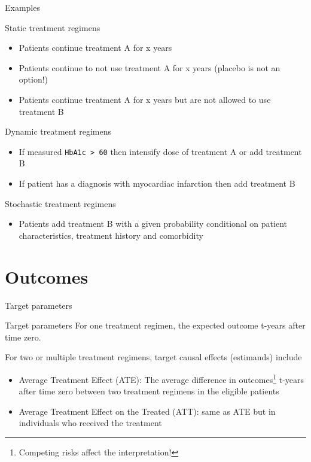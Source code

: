 \documentclass{beamer}\usepackage{listings}
\begin{document}
\begin{frame}[label={sec:orgbc0815b},fragile]{Examples}
 \begin{block}{Static treatment regimens}
\begin{itemize}
\item Patients continue treatment A for x years
\item Patients continue to not use treatment A for x years (placebo is not an option!)
\item Patients continue treatment A for x years but are not allowed to use treatment B
\end{itemize}
\end{block}

\begin{block}{Dynamic treatment regimens}
\begin{itemize}
\item If measured \texttt{HbA1c > 60} then intensify dose of treatment A or add treatment B
\item If patient has a diagnosis with myocardiac infarction then add treatment B
\end{itemize}
\end{block}

\begin{block}{Stochastic treatment regimens}
\begin{itemize}
\item Patients add treatment B with a given probability conditional on
patient characteristics, treatment history and comorbidity
\end{itemize}
\end{block}
\end{frame}

\section{Outcomes}
\label{sec:org4676376}

\begin{frame}[label={sec:orga004107}]{}
\huge \color{white}

Target parameters
\end{frame}


\begin{frame}[label={sec:org7a71644}]{Target parameters}
For one treatment regimen, the expected outcome t-years after time
zero.
\vfill

For two or multiple treatment regimens, target causal effects (estimands) include

\begin{itemize}
\item Average Treatment Effect (ATE): The average
difference in outcomes\footnote{Competing risks affect the interpretation!} t-years after time zero
between two treatment regimens in the eligible patients
\item Average Treatment Effect on the Treated (ATT): same as ATE but in
individuals who received the treatment
\end{itemize}
\end{frame}
\end{document}
